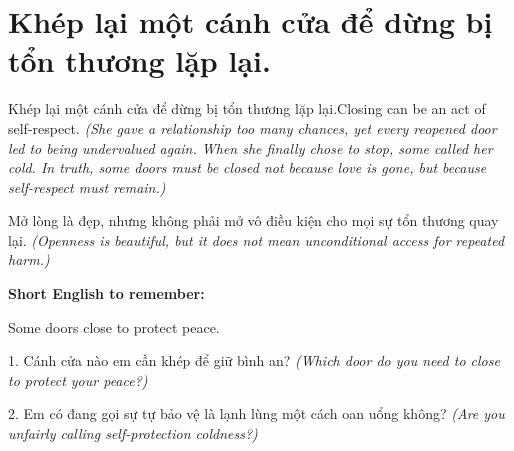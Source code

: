 \section{Khép lại một cánh cửa để dừng bị tổn thương lặp lại.}
\begin{truyen}{Khép lại một cánh cửa để dừng bị tổn thương lặp lại.}{Closing can be an act of self-respect.}
\textit{(She gave a relationship too many chances, yet every reopened door led to being undervalued again. When she finally chose to stop, some called her cold. In truth, some doors must be closed not because love is gone, but because self-respect must remain.)}
\end{truyen}
\begin{baihoc}
Mở lòng là đẹp, nhưng không phải mở vô điều kiện cho mọi sự tổn thương quay lại.
\textit{(Openness is beautiful, but it does not mean unconditional access for repeated harm.)}
\end{baihoc}
\begin{ghinhoanh}
\textbf{Short English to remember:}

Some doors close to protect peace.
\end{ghinhoanh}
\begin{tuhocnhanh}
1. Cánh cửa nào em cần khép để giữ bình an? \textit{(Which door do you need to close to protect your peace?)}

2. Em có đang gọi sự tự bảo vệ là lạnh lùng một cách oan uổng không? \textit{(Are you unfairly calling self-protection coldness?)}
\end{tuhocnhanh}
\ngancach

